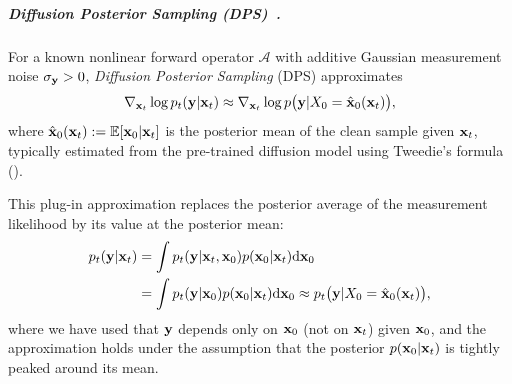 


\subparagraph{Diffusion Posterior Sampling (DPS)~\citep{chung2022diffusion}.}
For a known nonlinear forward operator $\mathcal A$ with additive Gaussian
measurement noise $\sigma_{{\mathbf{y}}}>0$, \emph{Diffusion Posterior Sampling}
(DPS) approximates
\begin{align}\label{eq:dps-score}
\nabla_{{\mathbf{x}}_t}\log p_t({\mathbf{y}}|{\mathbf{x}}_t)
\approx
\nabla_{{\mathbf{x}}_t}
\log p\bigl({\mathbf{y}}|X_0=\hat{{\mathbf{x}}}_0({\mathbf{x}}_t)\bigr),
\end{align}
where
$\hat{{\mathbf{x}}}_0({\mathbf{x}}_t):=\mathbb{E}[{\mathbf{x}}_0|{\mathbf{x}}_t]$
is the posterior mean of the clean sample given ${\mathbf{x}}_t$, typically estimated
from the pre-trained diffusion model using Tweedie's formula
(). 

This plug-in approximation replaces the posterior average of the measurement
likelihood by its value at the posterior mean:
\begin{align*}
  p_t({\mathbf{y}}|{\mathbf{x}}_t)
  &= \int p_t({\mathbf{y}}|{\mathbf{x}}_t, {\mathbf{x}}_0)  p({\mathbf{x}}_0|{\mathbf{x}}_t)  \mathrm{d}{\mathbf{x}}_0 \\
  &= \int p_t({\mathbf{y}}|{\mathbf{x}}_0)  p({\mathbf{x}}_0|{\mathbf{x}}_t)  \mathrm{d}{\mathbf{x}}_0 
   \approx  p_t\bigl({\mathbf{y}}|X_0=\hat{{\mathbf{x}}}_0({\mathbf{x}}_t)\bigr),
\end{align*}
where we have used that ${\mathbf{y}}$ depends only on ${\mathbf{x}}_0$ (not on ${\mathbf{x}}_t$) given ${\mathbf{x}}_0$, and the approximation holds under the assumption that the posterior $p({\mathbf{x}}_0|{\mathbf{x}}_t)$ is tightly peaked around its mean.

